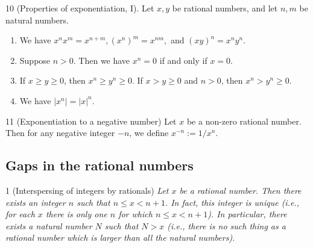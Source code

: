 \begin{proposition}{10}
    \label{rat-pow-nat-laws}
    (Properties of exponentiation, I). Let $x, y$ be rational numbers, and let $n, m$ be natural numbers.
    \begin{enumerate}
        \item We have $x^n x^m = x^{n + m}, (x^n)^m = x^{nm}, $ and $(xy)^n = x^n y^n$.
        \item Suppose $n > 0$. Then we have $x^n = 0$ if and only if $x = 0$.
        \item If $x \geq y \geq 0$, then $x^n \geq y^n \geq 0$. If $x > y \geq 0$ and $n > 0$, then $x^n > y^n \geq 0$.
        \item We have $|x^n| = |x|^n$.
    \end{enumerate}
\end{proposition}

\begin{definition}{11}
    \label{rat-pow-int}
    (Exponentiation to a negative number) Let $x$ be a non-zero rational number. Then for any negative integer $-n$, we
    define $x^{-n} := 1/x^n$.
\end{definition}


\subsection{Gaps in the rational numbers}
\begin{proposition}{1}
    \label{rat-integer-part}
    (Interspersing of integers by rationals) \emph{Let $x$ be a rational number. Then there exists an integer $n$ such
    that $n \leq x < n + 1$. In fact, this integer is unique (i.e., for each $x$ there is only one $n$ for which
    $n \leq x < n + 1$). In particular, there exists a natural number $N$ such that $N > x$ (i.e., there is no such
    thing as a rational number which is larger than all the natural numbers).}
\end{proposition}

